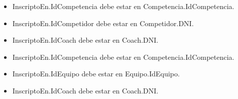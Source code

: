 \begin{itemize}
\begin{itemize}
        \item InscriptoEn.IdCompetencia debe estar en Competencia.IdCompetencia.
        \item InscriptoEn.IdCompetidor debe estar en Competidor.DNI.
        \item InscriptoEn.IdCoach debe estar en Coach.DNI.
        \item InscriptoEn.IdCompetencia debe estar en Competencia.IdCompetencia.
        \item InscriptoEn.IdEquipo debe estar en Equipo.IdEquipo.
        \item InscriptoEn.IdCoach debe estar en Coach.DNI.
    \end{itemize}
\end{itemize}
